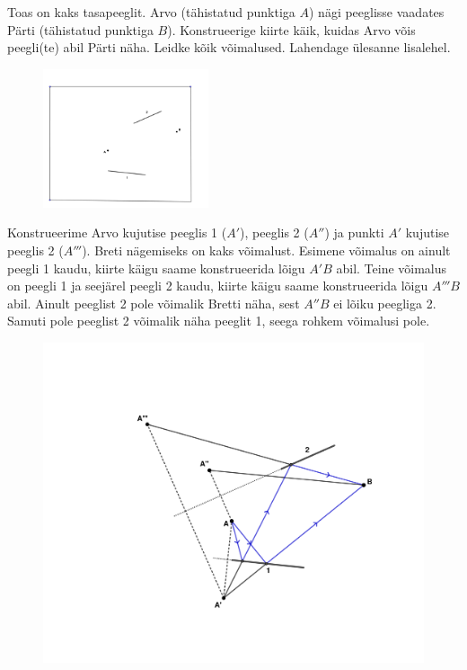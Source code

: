 
Toas on kaks tasapeeglit. Arvo (tähistatud punktiga $A$) nägi peeglisse vaadates Pärti (tähistatud punktiga $B$). Konstrueerige kiirte käik, kuidas Arvo võis peegli(te) abil Pärti näha. Leidke kõik võimalused. Lahendage ülesanne lisalehel.
\begin{figure}[h]
  \vspace{-1em}
  \centering
  \includegraphics[height=11em, trim=0 80 0 140, clip]{2022-v2g-01-yl.pdf}
  \vspace{-2em}
\end{figure}


\hint

\solu
Konstrueerime Arvo kujutise peeglis 1 ($A'$), peeglis 2 ($A''$) ja punkti $A'$ kujutise peeglis 2 ($A'''$). Breti nägemiseks on kaks võimalust. Esimene võimalus on ainult peegli 1 kaudu, kiirte käigu saame konstrueerida lõigu $A'B$ abil. Teine võimalus on peegli 1 ja seejärel peegli 2 kaudu, kiirte käigu saame konstrueerida lõigu $A'''B$ abil. Ainult peeglist 2 pole võimalik Bretti näha, sest $A''B$ ei lõiku peegliga 2. Samuti pole peeglist 2 võimalik näha peeglit 1, seega rohkem võimalusi pole.

\begin{figure}[h]
    \centering
    \includegraphics[width=\textwidth, trim=0 50 0 50, clip]{2022-v2g-01-sol.pdf}
\end{figure}
\probend